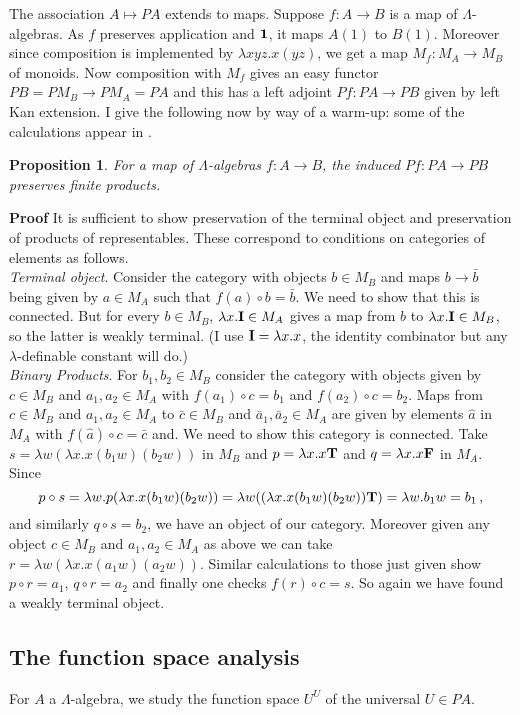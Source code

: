 \documentclass[12pt, amstex, amssymb]{article}
\newtheorem{proposition}[theorem]{Proposition}
\newcommand{\app}{{\bf 1}}
\newcommand{\cI}{{\bf I}}
\begin{document}
The association $A \mapsto PA$ extends to maps. 
Suppose $f: A \to B$ is a map of 
$\Lambda$-algebras. As $f$ preserves application and $\app$,
it maps $A(1)$ to $B(1)$. Moreover since composition is implemented by
$\lambda xyz. x(yz)$, we get a map
$M_f : M_A \to M_B$ of monoids. Now composition with $M_f$
gives an easy functor $PB = PM_B \to PM_A = PA$ and 
this has a left adjoint $Pf:PA \to PB$ given by left Kan extension.
I give the following now by way of a warm-up:
some of the calculations appear in \cite{Koy84}.
\begin{proposition}\label{prodpres}
For a map of $\Lambda$-algebras $f: A \to B$, the induced $Pf: PA \to PB$
preserves finite products.
\end{proposition}
{\bf Proof}
It is sufficient to show preservation of
the terminal object and
preservation of products of representables. 
These
correspond to conditions on categories of elements
as follows.\\
{\em Terminal object}. Consider the category with objects
$b \in M_B$ and maps $b \to \bar{b}$ being given by $a \in M_A$
such that $f(a)\circ b = \bar{b}$. We need to show that this is
connected. But for every $b \in M_B$, $\lambda x. \cI \in M_A$ 
gives a map from $b$ to $\lambda x. \cI \in M_B$, so the 
latter is weakly terminal. (I use $\cI = \lambda x.x$, the
identity combinator but any $\lambda$-definable 
constant will do.)\\
{\em Binary Products}. For $b_1,b_2 \in M_B$ consider the
category with objects given by $c \in M_B$ and
$a_1,a_2 \in M_A$ with $f(a_1) \circ c = b_1$ and
$f(a_2) \circ c = b_2$. Maps  from $c \in M_B$ and
$a_1,a_2 \in M_A$ to  $\bar{c} \in M_B$ and
$\bar{a}_1,\bar{a}_2 \in M_A$ are given by elements $\hat{a}$ in
$M_A$ with $f(\hat{a}) \circ c = \bar{c}$ and. We need to show this 
category is connected.
Take $s= \lambda w(\lambda x. x (b_1 w) (b_2 w))$ in $M_B$
and $p = \lambda x.x{\bf T}$ and $q = \lambda x . x{\bf F}$
in $M_A$. Since
\[
p \circ s =
\lambda w.p(\lambda x. x (b_1 w) (b_2 w)) =
\lambda w((\lambda x. x (b_1 w) (b_2 w)){\bf T}) =
\lambda w. b_1 w = b_1 \, ,
\]
and similarly $q \circ s = b_2$, 
we have an object of our category. Moreover given any object $c \in M_B$ and
$a_1,a_2 \in M_A$ as above we can take 
$r = \lambda w(\lambda x. x (a_1 w) (a_2 w))$. Similar calculations 
to those just given show $p \circ r = a_1$, $q \circ r = a_2$ and
finally one checks $f(r) \circ c = s$. So again we have found
a weakly terminal object.


\subsection{The function space analysis}\label{fnspace}
For $A$ a $\Lambda$-algebra, we study the function space 
$U^U$ of the universal $U \in PA$. 
\end{document}
